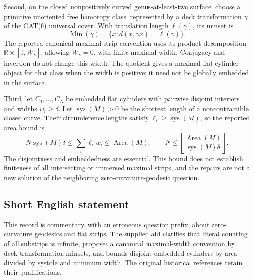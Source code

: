 \documentclass[11pt]{article}
\begin{document}
Second, on the closed nonpositively curved genus-at-least-two surface, choose a primitive unoriented free homotopy class, represented by a deck transformation \(\gamma\) of the CAT(0) universal cover. With translation length \(\ell(\gamma)\), its minset is
\[
 \operatorname{Min}(\gamma)=
 \{x:d(x,\gamma x)=\ell(\gamma)\}.
\]
The reported canonical maximal-strip convention uses its product decomposition \(\mathbb R\times[0,W_\gamma]\), allowing \(W_\gamma=0\), with finite maximal width. Conjugacy and inversion do not change this width. The quotient gives a maximal flat-cylinder object for that class when the width is positive; it need not be globally embedded in the surface.

Third, let \(C_1,\ldots,C_N\) be embedded flat cylinders with pairwise disjoint interiors and widths \(w_i\geq\delta\). Let \(\operatorname{sys}(M)>0\) be the shortest length of a noncontractible closed curve. Their circumference lengths satisfy \(\ell_i\geq\operatorname{sys}(M)\), so the reported area bound is
\[
 N\operatorname{sys}(M)\delta\leq
 \sum_i\ell_iw_i\leq\operatorname{Area}(M),\qquad
 N\leq\left\lfloor\frac{\operatorname{Area}(M)}{\operatorname{sys}(M)\delta}\right\rfloor.
\]
The disjointness and embeddedness are essential. This bound does not establish finiteness of all intersecting or immersed maximal strips, and the repairs are not a new solution of the neighboring zero-curvature-geodesic question.
\subsection{Short English statement}
This record is commentary, with an erroneous question prefix, about zero-curvature geodesics and flat strips. The supplied aid clarifies that literal counting of all substrips is infinite, proposes a canonical maximal-width convention by deck-transformation minsets, and bounds disjoint embedded cylinders by area divided by systole and minimum width. The original historical references retain their qualifications.
\end{document}
